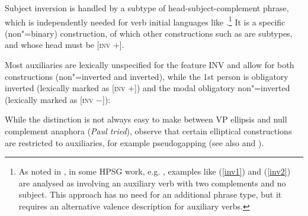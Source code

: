Subject inversion is handled by a subtype of head-subject-complement phrase, which is independently
needed for verb initial languages like  \parencites{Borsley99c-u}{SWB2003a}.\footnote{As
  noted in \crossrefchapterw[\page \pageref{page-properties:aux-inversion}]{properties}, in some HPSG work, e.g. ,
  examples like (\ref{inv1}) and (\ref{inv2}) are analysed as involving an auxiliary verb with two
  complements and no subject. This approach has no need for an additional phrase type, but it
  requires an alternative valence description for auxiliary verbs.} It is a specific (non"=binary)
construction, of which other constructions such as  are subtypes,
and whose head must be [\textsc{inv} $+$].
\ea
{} \impl
{}
\z
       
Most auxiliaries are lexically unspecified for the feature INV and allow for both constructions
(non"=inverted and inverted), while the 1st person  is obligatory inverted (lexically
marked as [\textsc{inv} $+$]) and the modal  obligatory non"=inverted (lexically marked
as [\textsc{inv} $-$]):

\eal
{}
\zl

While the distinction is not always easy to make between VP ellipsis and null complement anaphora
(\textit{Paul tried}), \citeauthor{Sagetal2020} observe that certain elliptical constructions are
restricted to auxiliaries, for example pseudogapping (see also  and \citealt{Miller2014a-u}).

\eal
{}
\zl

